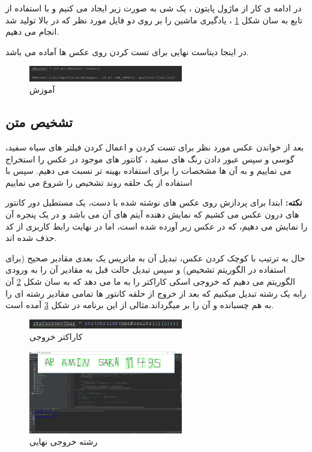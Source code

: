 \documentclass[oneside]{article}
\begin{document}
در ادامه ی کار  از ماژول
پایتون ، یک شی 
به صورت زیر ایجاد می کنیم و با استفاده از تابع 
به سان شکل 
\ref{ml}
، یادگیری ماشین را بر روی دو فایل مورد نظر که در بالا تولید شد انجام می دهیم.

در اینجا دیتاست نهایی برای تست کردن روی عکس ها آماده می باشد.
\begin{figure}
\centering
\includegraphics[width=0.6\textwidth]{Pictures/8.png}
\caption{آموزش}
\label{ml}
\end{figure}

\subsection{تشخیص متن}
بعد از خواندن عکس مورد نظر برای تست کردن و اعمال کردن فیلتر های سیاه سفید، گوسی و سپس عبور دادن رنگ های سفید ، کانتور های موجود در عکس را استخراج می نماییم و به آن ها مشخصات 
را برای استفاده بهینه تر نسبت می دهیم. سپس با استفاده از یک حلقه روند تشخیص را شروع می نماییم

\textbf{نکته: }
ابتدا برای پردازش روی عکس های نوشته شده با دست، یک مستطیل دور کانتور های درون عکس می کشیم که نمایش دهنده آیتم های آن می باشد و در یک پنجره آن را نمایش می دهیم، که در عکس زیر آورده شده است، اما در نهایت رابط کاربری از  کد حذف شده اند.

حال به ترتیب با کوچک کردن عکس، تبدیل آن به ماتریس یک بعدی  مقادیر صحیح (برای استفاده در الگوریتم تشخیص) و سپس تبدیل حالت قبل به مقادیر 
آن را به ورودی الگوریتم 
می دهیم که خروجی اسکی کاراکتر را به ما می دهد که به سان شکل
\ref{string}
 آن رابه یک رشته تبدیل میکنیم که بعد از خروج از حلقه کانتور ها تمامی مقادیر رشته ای را به هم چسبانده و آن را بر میگرداند.مثالی از این برنامه در شکل 
\ref{final}
آمده است.
\begin{figure}
\centering
\includegraphics[width=0.6\textwidth]{Pictures/9.png}
\caption{کاراکتر خروجی}
\label{string}
\end{figure}

\begin{figure}
\centering
\includegraphics[width=0.6\textwidth]{Pictures/10.png}
\caption{رشته خروجی نهایی}
\label{final}
\end{figure}
\end{document}
